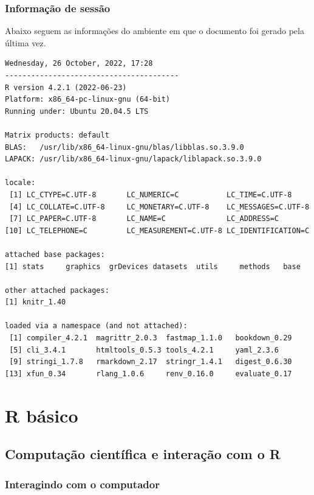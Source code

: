 \documentclass[
  10pt,
  a4paper]{book}
\begin{document}
\hypertarget{informauxe7uxe3o-de-sessuxe3o}{%
\section*{Informação de sessão}\label{informauxe7uxe3o-de-sessuxe3o}}


Abaixo seguem as informações do ambiente em que o documento foi gerado
pela última vez.

\begin{verbatim}
Wednesday, 26 October, 2022, 17:28
----------------------------------------
R version 4.2.1 (2022-06-23)
Platform: x86_64-pc-linux-gnu (64-bit)
Running under: Ubuntu 20.04.5 LTS

Matrix products: default
BLAS:   /usr/lib/x86_64-linux-gnu/blas/libblas.so.3.9.0
LAPACK: /usr/lib/x86_64-linux-gnu/lapack/liblapack.so.3.9.0

locale:
 [1] LC_CTYPE=C.UTF-8       LC_NUMERIC=C           LC_TIME=C.UTF-8       
 [4] LC_COLLATE=C.UTF-8     LC_MONETARY=C.UTF-8    LC_MESSAGES=C.UTF-8   
 [7] LC_PAPER=C.UTF-8       LC_NAME=C              LC_ADDRESS=C          
[10] LC_TELEPHONE=C         LC_MEASUREMENT=C.UTF-8 LC_IDENTIFICATION=C   

attached base packages:
[1] stats     graphics  grDevices datasets  utils     methods   base     

other attached packages:
[1] knitr_1.40

loaded via a namespace (and not attached):
 [1] compiler_4.2.1  magrittr_2.0.3  fastmap_1.1.0   bookdown_0.29  
 [5] cli_3.4.1       htmltools_0.5.3 tools_4.2.1     yaml_2.3.6     
 [9] stringi_1.7.8   rmarkdown_2.17  stringr_1.4.1   digest_0.6.30  
[13] xfun_0.34       rlang_1.0.6     renv_0.16.0     evaluate_0.17  
\end{verbatim}

\hypertarget{part-r-buxe1sico}{%
\part{R básico}\label{part-r-buxe1sico}}

\hypertarget{computauxe7uxe3o-cientuxedfica-e-interauxe7uxe3o-com-o-r}{%
\chapter{Computação científica e interação com o R}\label{computauxe7uxe3o-cientuxedfica-e-interauxe7uxe3o-com-o-r}}

\hypertarget{interagindo-com-o-computador}{%
\section{Interagindo com o computador}\label{interagindo-com-o-computador}}
\end{document}
